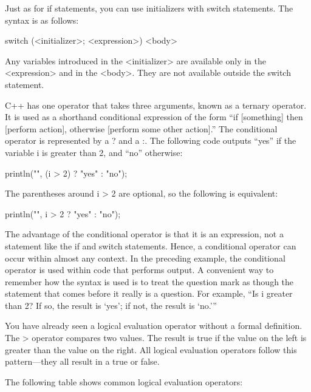 
Just as for if statements, you can use initializers with switch statements. The syntax is as follows:

\begin{cpp}
switch (<initializer>; <expression>) { <body> }
\end{cpp}

Any variables introduced in the <initializer> are available only in the <expression> and in the <body>. They are not available outside the switch statement.


C++ has one operator that takes three arguments, known as a ternary operator. It is used as a shorthand conditional expression of the form “if [something] then [perform action], otherwise [perform some other action].” The conditional operator is represented by a ? and a :. The following code outputs “yes” if the variable i is greater than 2, and “no” otherwise:

\begin{cpp}
println("{}", (i > 2) ? "yes" : "no");
\end{cpp}

The parentheses around i > 2 are optional, so the following is equivalent:

\begin{cpp}
println("{}", i > 2 ? "yes" : "no");
\end{cpp}

The advantage of the conditional operator is that it is an expression, not a statement like the if and switch statements. Hence, a conditional operator can occur within almost any context. In the preceding example, the conditional operator is used within code that performs output. A convenient way to remember how the syntax is used is to treat the question mark as though the statement that comes before it really is a question. For example, “Is i greater than 2? If so, the result is ‘yes’; if not, the result is ‘no.’”


You have already seen a logical evaluation operator without a formal definition. The > operator compares two values. The result is true if the value on the left is greater than the value on the right. All logical evaluation operators follow this pattern—they all result in a true or false.

The following table shows common logical evaluation operators:

